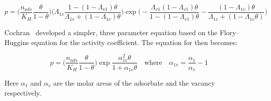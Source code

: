 \begin{equation}\label{pyg:eqn:wvst}
	p = \bigg( \frac{n_{ads}}{K_H} \frac{\theta}{1-\theta} \bigg)
	\bigg( \Lambda_{1v}
	\frac{1-(1-\Lambda_{v1})\theta}{\Lambda_{1v}+(1-\Lambda_{1v})\theta}
	\bigg)
	\exp{\bigg(
		-\frac{\Lambda_{v1}(1-\Lambda_{v1})\theta}{1-(1-\Lambda_{v1})\theta}
		-\frac{(1 - \Lambda_{1v})\theta}{\Lambda_{1v} +
			(1-\Lambda_{1v}\theta)} \bigg)}
\end{equation}

Cochran~\cite{cochranVacancySolutionTheory1985} developed a simpler, 
three parameter equation based on the Flory–Huggins equation for the 
activity coefficient. The equation for then becomes:

\begin{equation}\label{pyg:eqn:fhvst}
	p = \bigg( \frac{n_{ads}}{K_H} \frac{\theta}{1-\theta} \bigg)
	\exp{\frac{\alpha^2_{1v}\theta}{1+\alpha_{1v}\theta}}
	\quad \text{where} \quad
	\alpha_{1v} = \frac{\alpha_{1}}{\alpha_{v}} - 1
\end{equation}

Here \(\alpha_{1}\) and \(\alpha_{v}\) are the molar areas of the
adsorbate and the vacancy respectively.

